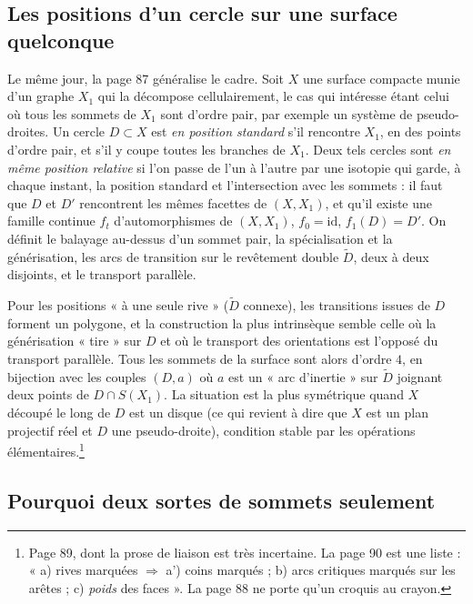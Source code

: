 \documentclass[11pt,a4paper]{article}
\begin{document}
\subsection*{Les positions d'un cercle sur une surface quelconque}

Le même jour, la page 87 généralise le cadre. Soit $X$ une surface compacte
munie d'un graphe $X_1$ qui la décompose cellulairement, le cas qui intéresse
étant celui où tous les sommets de $X_1$ sont d'ordre pair, par exemple un
système de pseudo-droites. Un cercle $D \subset X$ est \emph{en position
standard} s'il rencontre $X_1$, en des points d'ordre pair, et s'il y coupe
toutes les branches de $X_1$. Deux tels cercles sont \emph{en même position
relative} si l'on passe de l'un à l'autre par une isotopie qui garde, à chaque
instant, la position standard et l'intersection avec les sommets : il faut
que $D$ et $D'$ rencontrent les mêmes facettes de $(X, X_1)$, et qu'il existe une
famille continue $f_t$ d'automorphismes de $(X, X_1)$, $f_0 = \mathrm{id}$,
$f_1(D) = D'$. On définit le balayage au-dessus d'un sommet pair, la
spécialisation et la générisation, les arcs de transition sur le revêtement
double $\widetilde{D}$, deux à deux disjoints, et le transport parallèle.

Pour les positions « à une seule rive » ($\widetilde{D}$ connexe), les
transitions issues de $D$ forment un polygone, et la construction la plus
intrinsèque semble celle où la générisation « tire » sur $D$ et où le transport
des orientations est l'opposé du transport parallèle. Tous les sommets de la
surface sont alors d'ordre $4$, en bijection avec les couples $(D, a)$ où $a$
est un « arc d'inertie » sur $\widetilde{D}$ joignant deux points de $D \cap
S(X_1)$. La situation est la plus symétrique quand $X$ découpé le long de $D$
est un disque (ce qui revient à dire que $X$ est un plan projectif réel et $D$
une pseudo-droite), condition stable par les opérations
élémentaires.\footnote{Page 89, dont la prose de liaison est très incertaine. La
page 90 est une liste : « a) rives marquées $\Rightarrow$ a') coins marqués ;
b) arcs critiques marqués sur les arêtes ; c) \emph{poids} des faces ». La page
88 ne porte qu'un croquis au crayon.}

\subsection*{Pourquoi deux sortes de sommets seulement}
\end{document}
